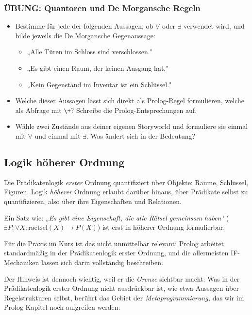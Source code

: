 \documentclass[parskip=half,a4paper,11pt]{scrreprt}
\begin{document}
\subsubsection{ÜBUNG: Quantoren und De Morgansche Regeln}

\begin{itemize}
    \item Bestimme für jede der folgenden Aussagen, ob $\forall$ oder $\exists$ verwendet wird, und bilde jeweils die De Morgansche Gegenaussage:
    \begin{itemize}
        \item „Alle Türen im Schloss sind verschlossen."
        \item „Es gibt einen Raum, der keinen Ausgang hat."
        \item „Kein Gegenstand im Inventar ist ein Schlüssel."
    \end{itemize}
    \item Welche dieser Aussagen lässt sich direkt als Prolog-Regel formulieren, welche als Abfrage mit \texttt{\textbackslash+}? Schreibe die Prolog-Entsprechungen auf.
    \item Wähle zwei Zustände aus deiner eigenen Storyworld und formuliere sie einmal mit $\forall$ und einmal mit $\exists$. Was ändert sich in der Bedeutung?
\end{itemize}

\subsection{Logik höherer Ordnung}

Die Prädikatenlogik \textit{erster} Ordnung quantifiziert über Objekte: Räume, Schlüssel, Figuren. Logik \textit{höherer} Ordnung erlaubt darüber hinaus, über Prädikate selbst zu quantifizieren, also über ihre Eigenschaften und Relationen. 

Ein Satz wie: \textit{„Es gibt eine Eigenschaft, die alle Rätsel gemeinsam haben"} ($\exists P\colon \forall X\colon \text{raetsel}(X) \rightarrow P(X)$) ist erst in höherer Ordnung formulierbar.

Für die Praxis im Kurs ist das nicht unmittelbar relevant: Prolog arbeitet standardmäßig in der Prädikatenlogik erster Ordnung, und die allermeisten IF-Mechaniken lassen sich darin vollständig beschreiben. 

Der Hinweis ist dennoch wichtig, weil er die \textit{Grenze} sichtbar macht: Was in der Prädikatenlogik erster Ordnung nicht ausdrückbar ist, wie etwa Aussagen über Regelstrukturen selbst, berührt das Gebiet der \textit{Metaprogrammierung,} das wir im Prolog-Kapitel noch aufgreifen werden.
\end{document}
